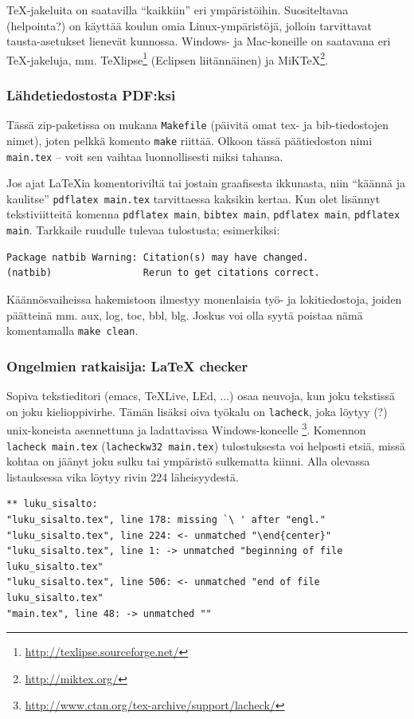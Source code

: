 TeX-jakeluita on saatavilla ``kaikkiin'' eri ympäristöihin.
Suositeltavaa (helpointa?) on käyttää koulun omia Linux-ympäristöjä,
jolloin tarvittavat tausta-asetukset lienevät kunnossa.  Windows- ja
Mac-koneille on saatavana eri TeX-jakeluja, mm.
TeXlipse\footnote{\url{http://texlipse.sourceforge.net/}} (Eclipsen
liitännäinen) ja MiKTeX\footnote{\url{http://miktex.org/}}.

\subsubsection{Lähdetiedostosta PDF:ksi}
\label{sec:esimkaannos}

Tässä zip-paketissa on mukana \verb!Makefile! (päivitä
omat tex- ja bib-tiedostojen nimet), joten pelkkä komento
\verb!make! riittää. Olkoon tässä päätiedoston nimi \verb!main.tex! --
voit sen vaihtaa luonnollisesti miksi tahansa.

Jos ajat \LaTeX{}ia komentoriviltä tai jostain graafisesta ikkunasta,
niin ``käännä ja kaulitse'' \verb!pdflatex main.tex! tarvittaessa kaksikin
kertaa. Kun olet lisännyt tekstiviitteitä komenna \verb!pdflatex main!,
\verb!bibtex main!, \verb!pdflatex main!, \verb!pdflatex main!. Tarkkaile
ruudulle tulevaa tulostusta; esimerkiksi:
%
\begin{verbatim}
Package natbib Warning: Citation(s) may have changed.
(natbib)                Rerun to get citations correct.
\end{verbatim}

Käännösvaiheissa hakemistoon ilmestyy monenlaisia työ- ja 
lokitiedostoja, joiden päätteinä mm. aux, log, toc, bbl, blg.
Joskus voi olla syytä poistaa nämä komentamalla \verb!make clean!.

\subsubsection{Ongelmien ratkaisija: \LaTeX{} checker}
\label{sec:esimlacheck}

Sopiva tekstieditori (emacs, TeXLive, LEd, $\ldots$) osaa
neuvoja, kun joku tekstissä on joku kielioppivirhe. Tämän 
lisäksi oiva työkalu on \verb!lacheck!, joka löytyy (?)
unix-koneista asennettuna ja ladattavissa 
Windows-koneelle%
\footnote{\url{http://www.ctan.org/tex-archive/support/lacheck/}}.
Komennon \verb!lacheck main.tex! (\verb!lacheckw32 main.tex!)
tulostuksesta voi helposti etsiä, missä kohtaa on jäänyt joku
sulku tai ympäristö sulkematta kiinni. Alla olevassa listauksessa
vika löytyy rivin 224 läheisyydestä.
%
\small
\begin{verbatim}
** luku_sisalto:
"luku_sisalto.tex", line 178: missing `\ ' after "engl."
"luku_sisalto.tex", line 224: <- unmatched "\end{center}"
"luku_sisalto.tex", line 1: -> unmatched "beginning of file luku_sisalto.tex"
"luku_sisalto.tex", line 506: <- unmatched "end of file luku_sisalto.tex"
"main.tex", line 48: -> unmatched ""
\end{verbatim}
\normalsize

